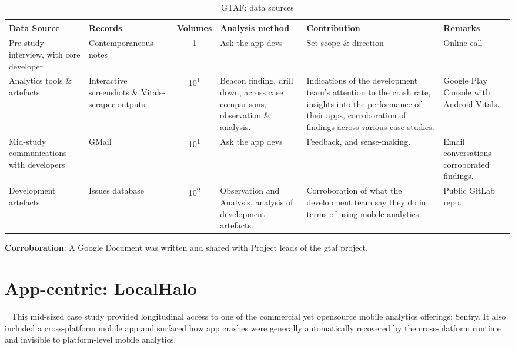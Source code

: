\begin{table*}
    \centering
    \footnotesize
    \tabcolsep=0.12cm
    \begin{tabular}{L{2.6cm} L{2.4cm} c L{2.75cm} L{3.75cm} L{2cm}}
        Data Source & Records & Volumes & Analysis method &Contribution & Remarks \\
        \toprule
         Pre-study interview, with core developer & Contemporaneous notes & 1 & Ask the app devs & Set scope \& direction & Online call \\
         Analytics tools \& artefacts &Interactive screenshots \& Vitals-scraper outputs &10\textsuperscript{1} & Beacon finding, drill down, across case comparisons, observation \& analysis. & Indications of the development team's attention to the crash rate, insights into the performance of their apps, corroboration of findings across various case studies. & Google Play Console with Android Vitals. \\         
         Mid-study communications with developers & GMail & 10\textsuperscript{1} & Ask the app devs & Feedback, and sense-making.  & Email conversations corroborated findings. \\
         Development artefacts  & Issues database & 10\textsuperscript{2} & Observation and Analysis, analysis of development artefacts. & Corroboration of what the development team say they do in terms of using mobile analytics. & Public GitLab repo. \\
         \bottomrule
    \end{tabular}
    \caption{GTAF: data sources}
    \label{tab:gtaf-data-sources}
\end{table*}

\textbf{Corroboration}:  A Google Document was written and shared with Project leads of the \acrfull{gtaf} project.





\section{App-centric: LocalHalo}~\label{case-study-overview-localhalo}
This mid-sized case study provided longitudinal access to one of the commercial yet opensource mobile analytics offerings: Sentry. It also included a cross-platform mobile app and surfaced how app crashes were generally automatically recovered by the cross-platform runtime and invisible to platform-level mobile analytics.

